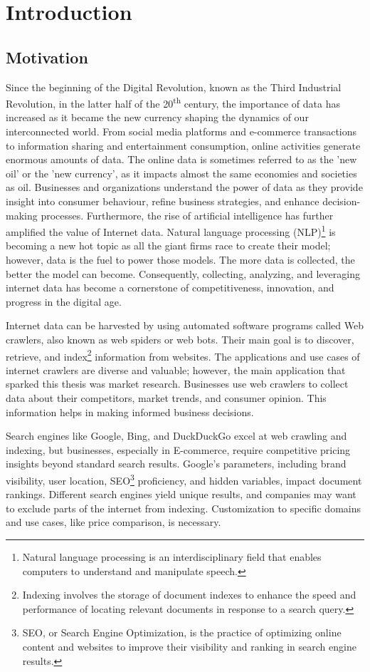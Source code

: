 \chapter{Introduction}
\label{chap:introduction}
\section{Motivation}


Since the beginning of the Digital Revolution, known as the Third Industrial Revolution, in the latter half of the 20\textsuperscript{th} century, the importance of data has increased as it became the new currency shaping the dynamics of our interconnected world. From social media platforms and e-commerce transactions to information sharing and entertainment consumption, online activities generate enormous amounts of data. The online data is sometimes referred to as the 'new oil' or the 'new currency', as it impacts almost the same economies and societies as oil. Businesses and organizations understand the power of data as they provide insight into consumer behaviour, refine business strategies, and enhance decision-making processes. Furthermore, the rise of artificial intelligence has further amplified the value of Internet data. Natural language processing (NLP)\footnote{Natural language processing is an interdisciplinary field that enables computers to understand and manipulate speech.} is becoming a new hot topic as all the giant firms race to create their model; however, data is the fuel to power those models. The more data is collected, the better the model can become. Consequently, collecting, analyzing, and leveraging internet data has become a cornerstone of competitiveness, innovation, and progress in the digital age.

Internet data can be harvested by using automated software programs called Web crawlers, also known as web spiders or web bots. Their main goal is to discover, retrieve, and index\footnote{Indexing involves the storage of document indexes to enhance the speed and performance of locating relevant documents in response to a search query.} information from websites. The applications and use cases of internet crawlers are diverse and valuable; however, the main application that sparked this thesis was market research. Businesses use web crawlers to collect data about their competitors, market trends, and consumer opinion. This information helps in making informed business decisions.
 
Search engines like Google, Bing, and DuckDuckGo excel at web crawling and indexing, but businesses, especially in E-commerce, require competitive pricing insights beyond standard search results. Google's parameters, including brand visibility, user location, SEO\footnote{SEO, or Search Engine Optimization, is the practice of optimizing online content and websites to improve their visibility and ranking in search engine results.} proficiency, and hidden variables, impact document rankings. Different search engines yield unique results, and companies may want to exclude parts of the internet from indexing. Customization to specific domains and use cases, like price comparison, is necessary.

